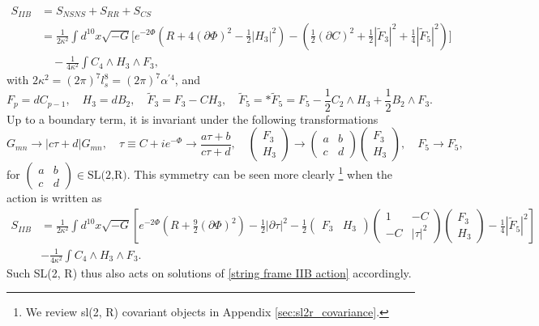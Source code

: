 \begin{equation}
\begin{aligned}
S_{IIB}
&=S_{NSNS} + S_{RR} + S_{CS}\\
&=\frac{1}{2\kappa^2}
\int d^{10}x \sqrt{-G}
\Bigg[
e^{-2\Phi}\left(R + 4(\partial\Phi)^2-\frac{1}{2}|H_3|^2\right)
-\left(\frac{1}{2}(\partial C)^2+\frac{1}{2}|\tilde F_3|^2+\frac{1}{4}|\tilde{F}_5|^2\right)
\Bigg]\\
&\quad -\frac{1}{4\kappa^2}\int C_4\wedge H_3\wedge F_3,
\end{aligned}
\label{string frame IIB action}
\end{equation}
with $2\kappa^2=(2\pi)^7l_s^8=(2\pi)^7\alpha^{\prime 4}$, and
\begin{equation}
F_p = dC_{p-1}, \quad 
H_3 = dB_2, \quad
\tilde F_3 = F_3 - C H_3,\quad
\tilde F_5 = * \tilde F_5 = F_5 - \frac12 C_2\wedge H_3 + \frac12 B_2\wedge F_3.
\end{equation}
Up to a boundary term, it is invariant under the following transformations
\begin{equation}
G_{mn}\to |c\tau+d|G_{mn},\quad
\tau\equiv C + i e^{-\Phi} \to \frac{a\tau+b}{c\tau+d},\quad
\begin{pmatrix}
F_3\\H_3
\end{pmatrix}
\to
\begin{pmatrix}
a & b \\ c & d
\end{pmatrix}
\begin{pmatrix}
F_3\\H_3
\end{pmatrix},\quad
F_5 \to F_5,
\end{equation}
for $\begin{pmatrix}
a&b\\c&d
\end{pmatrix}
\in \text{SL(2,R)}$.
This symmetry can be seen more clearly \footnote{
    We review sl(2, R) covariant objects in Appendix \ref{sec:sl2r_covariance}.
} when the action is written as
\begin{equation}
\begin{aligned}
S_{IIB}
&=
\frac{1}{2\kappa^2}\int d^{10}x\sqrt{-G}
\left[
    e^{-2\Phi}\left(R+\frac{9}{2}(\partial\Phi)^2\right)
    -\frac{1}{2}|\partial\tau|^2
    -\frac{1}{2}\begin{pmatrix}
        F_3 & H_3
    \end{pmatrix}
    \begin{pmatrix}
        1 & -C \\ -C &|\tau|^2
    \end{pmatrix}
    \begin{pmatrix}
        F_3 \\ H_3
    \end{pmatrix}
    -\frac{1}{4}|\tilde{F}_5|^2
\right]\\
&-\frac{1}{4\kappa^2}\int C_4 \wedge H_3\wedge F_3.
\end{aligned}
\end{equation}
Such SL(2, R) thus also acts on solutions of \eqref{string frame IIB action} accordingly.


